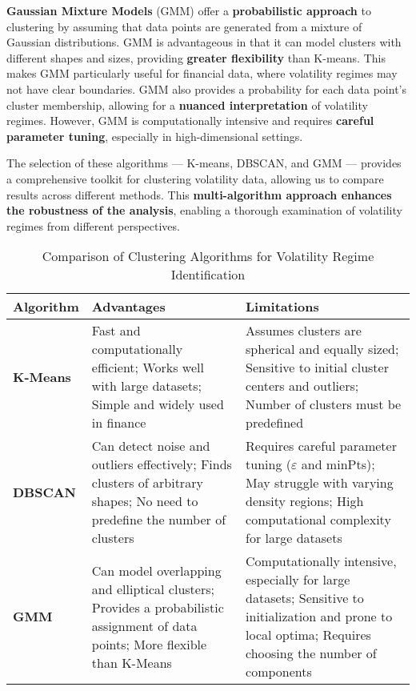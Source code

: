 \textbf{Gaussian Mixture Models} (GMM) offer a \textbf{probabilistic approach} to clustering by assuming that data points are generated from a mixture of Gaussian distributions. GMM is advantageous in that it can model clusters with different shapes and sizes, providing \textbf{greater flexibility} than K-means. This makes GMM particularly useful for financial data, where volatility regimes may not have clear boundaries. GMM also provides a probability for each data point’s cluster membership, allowing for a \textbf{nuanced interpretation} of volatility regimes. However, GMM is computationally intensive and requires \textbf{careful parameter tuning}, especially in high-dimensional settings.

The selection of these algorithms — K-means, DBSCAN, and GMM — provides a comprehensive toolkit for clustering volatility data, allowing us to compare results across different methods. This \textbf{multi-algorithm approach enhances the robustness of the analysis}, enabling a thorough examination of volatility regimes from different perspectives.

\begin{table}[H]
    \centering
    \caption{Comparison of Clustering Algorithms for Volatility Regime Identification}
    \label{tab:clustering_comparison}
    \begin{tabular}{|l|p{6cm}|p{6cm}|}
        \hline
        \textbf{Algorithm} & \textbf{Advantages} & \textbf{Limitations} \\
        \hline
        \textbf{K-Means} & Fast and computationally efficient; Works well with large datasets; Simple and widely used in finance & Assumes clusters are spherical and equally sized; Sensitive to initial cluster centers and outliers; Number of clusters must be predefined \\
        \hline
        \textbf{DBSCAN} & Can detect noise and outliers effectively; Finds clusters of arbitrary shapes; No need to predefine the number of clusters & Requires careful parameter tuning ($\varepsilon$ and minPts); May struggle with varying density regions; High computational complexity for large datasets \\
        \hline
        \textbf{GMM} & Can model overlapping and elliptical clusters; Provides a probabilistic assignment of data points; More flexible than K-Means & Computationally intensive, especially for large datasets; Sensitive to initialization and prone to local optima; Requires choosing the number of components \\
        \hline
    \end{tabular}
\end{table}

